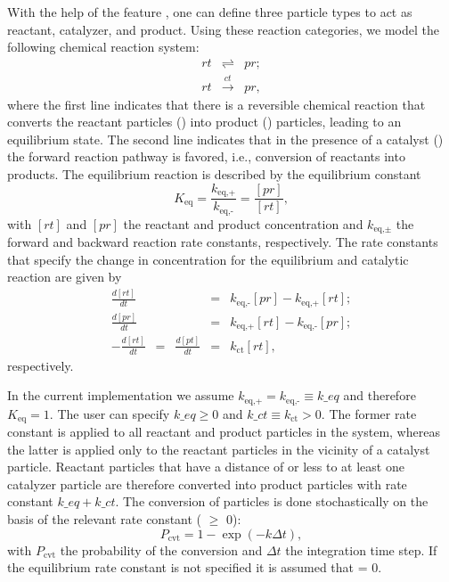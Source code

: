 With the help of the feature , one can
define three particle types to act as reactant, catalyzer, and
product. Using these reaction categories, we model the following
chemical reaction system:
\begin{eqnarray}
rt & \rightleftharpoons & pr ; \\
rt & \xrightarrow{ct} & pr,
\end{eqnarray}
where the first line indicates that there is a reversible chemical
reaction that converts the reactant particles () into product
() particles, leading to an equilibrium state. The second line
indicates that in the presence of a catalyst () the forward
reaction pathway is favored, i.e., conversion of reactants into
products. The equilibrium reaction is described by the equilibrium
constant
\begin{equation}
K_{\text{eq}} = \frac{k_{\text{eq,+}}}{k_{\text{eq,-}}} = \frac{[pr]}{[rt]},
\end{equation}
with $[rt]$ and $[pr]$ the reactant and product concentration and
$k_{\text{eq,$\pm$}}$ the forward and backward reaction rate
constants, respectively. The rate constants that specify the change in
concentration for the equilibrium and catalytic reaction are given by
\begin{eqnarray}
\frac{d[rt]}{dt} & = & k_{\text{eq,-}}[pr] - k_{\text{eq,+}}[rt] ; \\
\frac{d[pr]}{dt} & = & k_{\text{eq,+}}[rt] - k_{\text{eq,-}}[pr] ; \\
-\frac{d[rt]}{dt} \;\: = \;\: \frac{d[pt]}{dt} & = & k_{\text{ct}}[rt] ,
\end{eqnarray}
respectively.

In the current \es implementation we assume $k_{\text{eq,+}} =
k_{\text{eq,-}} \equiv k\_eq$ and therefore $K_{\text{eq}}=1$. The
user can specify $k\_eq \ge 0$ and $k\_ct \equiv k_{\text{ct}} >
0$. The former rate constant is applied to all reactant and product
particles in the system, whereas the latter is applied only to the
reactant particles in the vicinity of a catalyst particle. Reactant
particles that have a distance of  or less to at least one
catalyzer particle are therefore converted into product particles with
rate constant $k\_eq + k\_ct$. The conversion of particles is done
stochastically on the basis of the relevant rate constant (
$\ge$ 0):
\begin{equation}
\label{eq:rate} P_{\text{cvt}} = 1 - \exp \left( - k  \Delta t  \right) ,
\end{equation}
with $P_{\text{cvt}}$ the probability of the conversion and $\Delta t$
the integration time step. If the equilibrium rate constant is not
specified it is assumed that  = 0.

